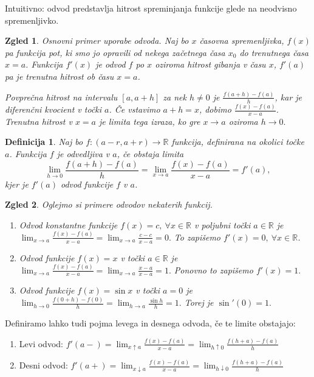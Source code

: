 \documentclass[10pt, a4paper]{article}
\newtheorem{defi}{Definicija}[section]
\newenvironment{noticeB}{%
  \tcolorbox[%
  notitle,
  empty,
  enhanced,  %
  breakable,
  coltext=black,
  colback=white, 
  fontupper=\rmfamily,
  parbox=false,
  noparskip,
  sharp corners,
  boxrule=-1pt,  %
  frame hidden,
  left=7pt,  %
  right=7pt,
  top=5pt,
  bottom=5pt,
  before skip=2.5ex plus 2pt,
  after skip=2.5ex plus 2pt,
  borderline west = {1.5pt}{-0.1pt}{blue!30!black}, %
  overlay unbroken and last={%
    \draw[color=black, line width=1.25pt]
    ($(frame.south west)+(1.pt, -0.1pt)$) -- ++(2em, 0);
  }
  ]}
{\endtcolorbox}
\newenvironment{definicija}{\begin{defi}\begin{noticeB}}{%
    \end{noticeB}\end{defi}}
\newtheorem{zgled}{Zgled}[section]
\newcommand{\R}{\mathbb {R}}
\newcommand{\limf}[3]{\lim_{#1 \to #2} {#3}}
\newcommand{\rlimf}[3]{\lim_{#1 \downarrow #2} {#3}}
\newcommand{\llimf}[3]{\lim_{#1 \uparrow #2} {#3}}
\begin{document}
Intuitivno: odvod predstavlja hitrost spreminjanja funkcije glede na neodvisno spremenljivko.

\begin{zgled}
    Osnovni primer uporabe odvoda.      
    Naj bo $x$ časovna spremenljivka, $f(x)$ pa funkcija pot, ki smo jo opravili od nekega začetnega časa $x_0$ do trenutnega časa $x = a$.
    Funkcija $f'(x)$ je odvod $f$ po $x$ oziroma hitrost gibanja v času $x$, $f'(a)$ pa je trenutna hitrost ob času $x = a$.

    Povprečna hitrost na intervalu $[a, a+h]$ za nek $h \neq 0$ je 
    $\frac{f(a+h) - f(a)}{h}$, kar je diferenčni kvocient v točki $a$. 
    Če vstavimo $a+h = x$, dobimo $\frac{f(x) - f(a)}{x - a}$. 
    Trenutna hitrost v $x = a$ je limita tega izraza, ko gre $x \rightarrow a$ oziroma
    $h\rightarrow 0.$ 
\end{zgled}

\begin{definicija}
    Naj bo $f: (a - r, a+ r) \rightarrow \R$ funkcija, definirana na okolici točke $a$.
    Funkcija $f$ je odvedljiva v $a$, če obstaja limita
    \begin{equation*}
        \limf{h}{0}{\frac{f(a+h) - f(a)}{h}} = \limf{x}{a}{\frac{f(x) - f(a)}{x-a}} = f'(a),
    \end{equation*}
    kjer je $f'(a)$ odvod funkcije $f$ v $a$.
\end{definicija}

\begin{zgled}
    Oglejmo si primere odvodov nekaterih funkcij.
    \begin{enumerate}
        \item Odvod konstantne funkcije $f(x) = c,\ \forall x \in \R$ v poljubni točki $a \in \R$ je 
        $\limf{x}{a}{\frac{f(x) - f(a)}{x-a}} = \limf{x}{a}{\frac{c-c}{x-a}} = 0.$
        To zapišemo $f'(x) = 0,\ \forall x \in \R$.
        \item Odvod funkcije $f(x) = x$ v točki $a \in \R$ je $\limf{x}{a}{\frac{f(x)- f(a)}{x-a}} = \limf{x}{a}{\frac{x-a}{x-a}} = 1.$
        Ponovno to zapišemo $f'(x) = 1.$
        \item Odvod funkcije $f(x) = \sin{x}$ v točki $a = 0$ je $\limf{h}{0}{\frac{f(0+h) - f(0)}{h}} = \limf{h}{a}{\frac{\sin{h}}{h}} = 1.$ 
        Torej je $\sin'{(0)} = 1.$
    \end{enumerate}
\end{zgled}

Definiramo lahko tudi pojma levega in desnega odvoda, če te limite obstajajo:
\begin{enumerate}
    \item Levi odvod: $\displaystyle f'(a-) = \llimf{x}{a}{\frac{f(x) - f(a)}{x-a}} = \llimf{h}{0}{\frac{f(h+a) - f(a)}{h}}$
    \item Desni odvod: $\displaystyle f'(a+) = \rlimf{x}{a}{\frac{f(x) - f(a)}{x-a}} = \rlimf{h}{0}{\frac{f(h+a) - f(a)}{h}}$
\end{enumerate}
\end{document}
